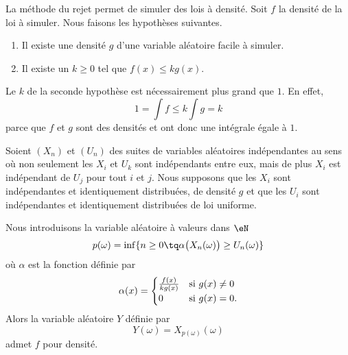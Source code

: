 La méthode du rejet permet de simuler des lois à densité. Soit \( f\) la densité de la loi à simuler. Nous faisons les hypothèses suivantes.
\begin{enumerate}
    \item
        Il existe une densité \( g\) d'une variable aléatoire facile à simuler.
    \item
        Il existe un \( k\geq 0\) tel que \( f(x)\leq kg(x)\).
\end{enumerate}

\begin{remark}
    Le \( k\) de la seconde hypothèse est nécessairement plus grand que \( 1\). En effet,
    \begin{equation}
        1=\int f\leq k\int g=k
    \end{equation}
    parce que \( f\) et \( g\) sont des densités et ont donc une intégrale égale à \( 1\).
\end{remark}

\begin{proposition}
    Soient \( (X_n)\) et \( (U_n)\) des suites de variables aléatoires indépendantes au sens où non seulement les \( X_i\) et \( U_k\) sont indépendants entre eux, mais de plus \( X_i\) est indépendant de \( U_j\) pour tout \( i\) et \( j\). Nous supposons que les \( X_i\) sont indépendantes et identiquement distribuées, de densité \( g\) et que les \( U_i\) sont indépendantes et identiquement distribuées de loi uniforme.

    Nous introduisons la variable aléatoire à valeurs dans \( \eN\)
    \begin{equation}
        p(\omega)=\inf\{ n\geq 0\tq \alpha\big( X_n(\omega) \big)\geq U_n(\omega) \}
    \end{equation}
    où \( \alpha\) est la fonction définie par
    \begin{equation}
        \alpha(x)=\begin{cases}
            \frac{ f(x) }{ kg(x) }    &   \text{si \( g(x)\neq 0\)}\\
            0    &    \text{si \( g(x)=0\)}.
        \end{cases}
    \end{equation}
    Alors la variable aléatoire \( Y\) définie par 
    \begin{equation}
        Y(\omega)=X_{p(\omega)}(\omega)
    \end{equation}
    admet \( f\) pour densité.
\end{proposition}

